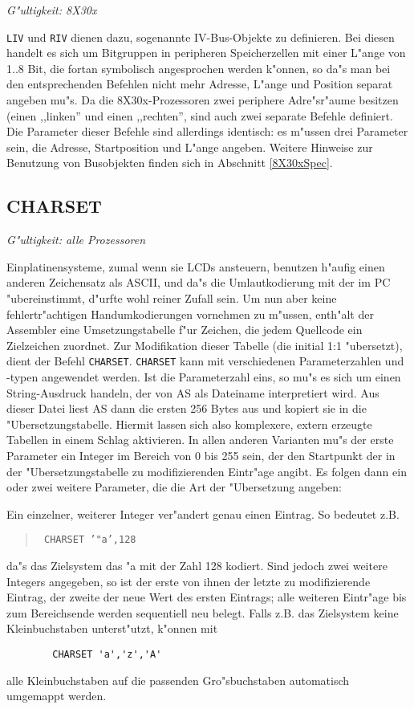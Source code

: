 \documentclass[12pt,a4paper,twoside]{report}
\makeatletter
\newcommand{\tty}[1]{{\tt #1}}
\newcommand{\ttindex}[1]{\index{#1@{\tt #1}}}
\makeatother
\begin{document}
{\em G"ultigkeit: 8X30x}

\tty{LIV} und \tty{RIV} dienen dazu, sogenannte IV-Bus-Objekte zu definieren.
Bei diesen handelt es sich um Bitgruppen in peripheren Speicherzellen
mit einer L"ange von 1..8 Bit, die fortan symbolisch angesprochen
werden k"onnen, so da"s man bei den entsprechenden Befehlen nicht mehr
Adresse, L"ange und Position separat angeben mu"s.  Da die
8X30x-Prozessoren zwei periphere Adre"sr"aume besitzen (einen ,,linken''
und einen ,,rechten'', sind auch zwei separate Befehle definiert.  Die
Parameter dieser Befehle sind allerdings identisch: es m"ussen drei
Parameter sein, die Adresse, Startposition und L"ange angeben.
Weitere Hinweise zur Benutzung von Busobjekten finden sich in
Abschnitt \ref{8X30xSpec}.


\subsection{CHARSET}
\ttindex{CHARSET}

{\em G"ultigkeit: alle Prozessoren}

Einplatinensysteme, zumal wenn sie LCDs ansteuern, benutzen h"aufig
einen anderen Zeichensatz als ASCII, und da"s die Umlautkodierung mit
der im PC "ubereinstimmt, d"urfte wohl reiner Zufall sein.  Um nun
aber keine fehlertr"achtigen Handumkodierungen vornehmen zu m"ussen,
enth"alt der Assembler eine Umsetzungstabelle f"ur Zeichen, die jedem
Quellcode ein Zielzeichen zuordnet.  Zur Modifikation dieser Tabelle
(die initial 1:1 "ubersetzt), dient der Befehl \tty{CHARSET}.
\tty{CHARSET} kann mit verschiedenen Parameterzahlen und -typen angewendet
werden.  Ist die Parameterzahl eins, so mu"s es sich um einen
String-Ausdruck handeln, der von AS als Dateiname interpretiert wird.  Aus
dieser Datei liest AS dann die ersten 256 Bytes aus und kopiert sie in die
"Ubersetzungstabelle.  Hiermit lassen sich also komplexere, extern
erzeugte Tabellen in einem Schlag aktivieren.  In allen anderen Varianten
mu"s der erste Parameter ein Integer im Bereich von 0 bis 255 sein, der
den Startpunkt der in der "Ubersetzungstabelle zu modifizierenden
Eintr"age angibt.  Es folgen dann ein oder zwei weitere Parameter, die die
Art der "Ubersetzung angeben:

Ein einzelner, weiterer Integer ver"andert genau einen Eintrag.  So
bedeutet z.B.
\begin{quote}{\tt
        CHARSET '"a',128}
\end{quote}
da"s das Zielsystem das "a mit der Zahl 128 kodiert.  Sind jedoch zwei
weitere Integers angegeben, so ist der erste von ihnen der letzte zu
modifizierende Eintrag, der zweite der neue Wert des ersten Eintrags; alle
weiteren Eintr"age bis zum Bereichsende werden sequentiell neu belegt.
Falls z.B. das Zielsystem keine Kleinbuchstaben unterst"utzt, k"onnen mit
\begin{verbatim}
        CHARSET 'a','z','A'
\end{verbatim}
alle Kleinbuchstaben auf die passenden Gro"sbuchstaben automatisch
umgemappt werden.
\end{document}
